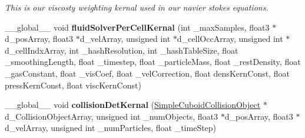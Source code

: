 \begin{DoxyCompactItemize}
\begin{DoxyCompactList}\small\item\em This is our viscosty weighting kernal used in our navier stokes equations. \end{DoxyCompactList}\item 
\hypertarget{_cuda_s_p_h_kernals_8cu_a8e6781d18982655b4efd3db1e6548a41}{\-\_\-\-\_\-global\-\_\-\-\_\- void {\bfseries fluid\-Solver\-Per\-Cell\-Kernal} (int \-\_\-max\-Samples, float3 $\ast$d\-\_\-pos\-Array, float3 $\ast$d\-\_\-vel\-Array, unsigned int $\ast$d\-\_\-cell\-Occ\-Array, unsigned int $\ast$d\-\_\-cell\-Indx\-Array, int \-\_\-hash\-Resolution, int \-\_\-hash\-Table\-Size, float \-\_\-smoothing\-Length, float \-\_\-timestep, float \-\_\-particle\-Mass, float \-\_\-rest\-Density, float \-\_\-gas\-Constant, float \-\_\-vis\-Coef, float \-\_\-vel\-Correction, float dens\-Kern\-Const, float press\-Kern\-Const, float visc\-Kern\-Const)}\label{_cuda_s_p_h_kernals_8cu_a8e6781d18982655b4efd3db1e6548a41}

\item 
\hypertarget{_cuda_s_p_h_kernals_8cu_a560b747b87c9a6159b06cc73e719e144}{\-\_\-\-\_\-global\-\_\-\-\_\- void {\bfseries collision\-Det\-Kernal} (\hyperlink{struct_simple_cuboid_collision_object}{Simple\-Cuboid\-Collision\-Object} $\ast$d\-\_\-\-Collision\-Object\-Array, unsigned int \-\_\-num\-Objects, float3 $\ast$d\-\_\-pos\-Array, float3 $\ast$d\-\_\-vel\-Array, unsigned int \-\_\-num\-Particles, float \-\_\-time\-Step)}\label{_cuda_s_p_h_kernals_8cu_a560b747b87c9a6159b06cc73e719e144}


\end{DoxyCompactItemize}

